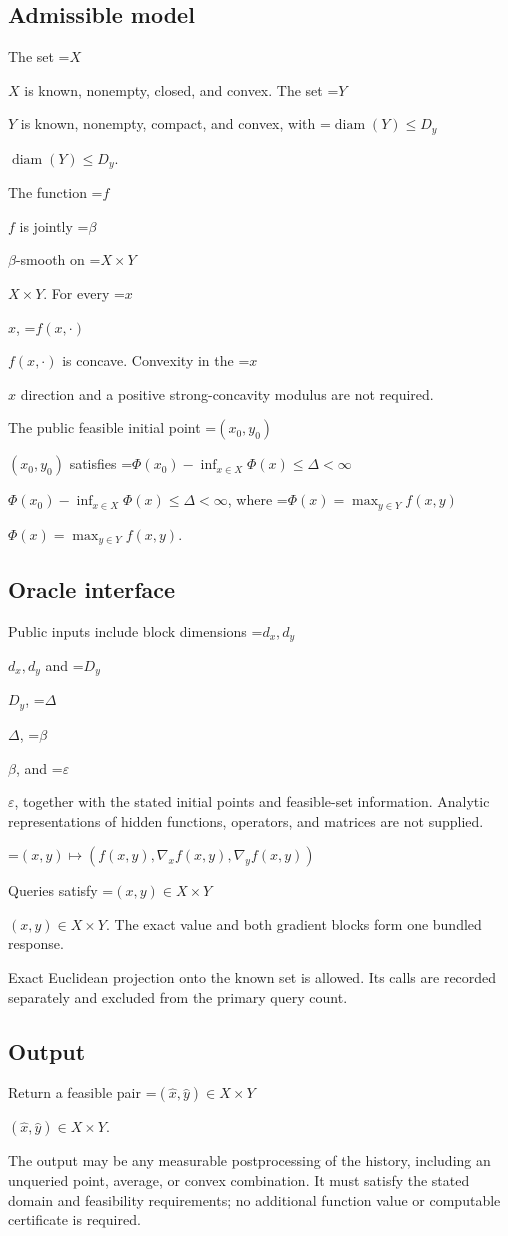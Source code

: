 \documentclass[10pt,a4paper]{article}
\newcommand{\AtlasMath}[1]{\par\begingroup\centering\setbox0=\hbox{$\displaystyle #1$}\ifdim\wd0>1.4\linewidth\typeout{ATLAS WIDE FORMULA: \the\wd0}\fi\ifdim\wd0>\linewidth\resizebox{\linewidth}{!}{\box0}\else\box0\fi\par\endgroup}
\newcommand{\AtlasInlineMath}[1]{\begingroup\setbox0=\hbox{$#1$}\ifdim\wd0>.4\linewidth\endgroup\AtlasMath{#1}\else\endgroup$#1$\fi}
\begin{document}
\subsection{Admissible model}
The set \AtlasInlineMath{X} is known, nonempty, closed, and convex. The set \AtlasInlineMath{Y} is known, nonempty, compact, and convex, with \AtlasInlineMath{\operatorname{diam}(Y)\le D_y}.

The function \AtlasInlineMath{f} is jointly \AtlasInlineMath{\beta}-smooth on \AtlasInlineMath{X\times Y}. For every \AtlasInlineMath{x}, \AtlasInlineMath{f(x,\cdot)} is concave. Convexity in the \AtlasInlineMath{x} direction and a positive strong-concavity modulus are not required.

The public feasible initial point \AtlasInlineMath{(x_0,y_0)} satisfies \AtlasInlineMath{\Phi(x_0)-\inf_{x\in X}\Phi(x)\le\Delta<\infty}, where \AtlasInlineMath{\Phi(x)=\max_{y\in Y}f(x,y)}.

\subsection{Oracle interface}
Public inputs include block dimensions \AtlasInlineMath{d_x,d_y} and \AtlasInlineMath{D_y}, \AtlasInlineMath{\Delta}, \AtlasInlineMath{\beta}, and \AtlasInlineMath{\varepsilon}, together with the stated initial points and feasible-set information. Analytic representations of hidden functions, operators, and matrices are not supplied.


\AtlasMath{(x,y)\longmapsto(f(x,y),\nabla_xf(x,y),\nabla_yf(x,y))}


Queries satisfy \AtlasInlineMath{(x,y)\in X\times Y}. The exact value and both gradient blocks form one bundled response.

Exact Euclidean projection onto the known set is allowed. Its calls are recorded separately and excluded from the primary query count.

\subsection{Output}
Return a feasible pair \AtlasInlineMath{(\widehat x,\widehat y)\in X\times Y}.

The output may be any measurable postprocessing of the history, including an unqueried point, average, or convex combination. It must satisfy the stated domain and feasibility requirements; no additional function value or computable certificate is required.
\end{document}
